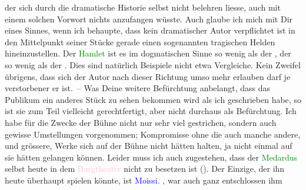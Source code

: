                der sich durch die dramatische Historie selbst nicht belehren liesse, auch mit einem
               solchen Vorwort nichts anzufangen wüsste. Auch glaube ich mich mit Dir eines Sinnes,
               wenn ich behaupte, dass kein dramatischer Autor verpflichtet ist in den Mittelpunkt
               seiner Stücke gerade einen sogenannt\introOben{}en\introOben{} tragischen Helden
               hineinzustellen. Der \textcolor{green}{Hamlet}{} ist
               es im dogmatischen Sinne so wenig als der \label{K_L01981_1v}\label{K_L01981_1h}, der
                  \label{K_L01981_2v}\label{K_L01981_2h} so wenig als der \label{K_L01981_3v}\label{K_L01981_3h}. Dies sind natürlich Beispiele nicht etwa Vergleiche. Kein
               Zweifel übrigens, dass sich der Autor nach dieser Richtung umso mehr erlauben darf je
               verstorbener er ist. – Was Deine weitere Befürchtung anbe{\pb}langt, dass das
               Publikum ein anderes Stück zu sehen bekommen wird als ich geschrieben habe, so ist
               sie zum Teil vielleicht gerechtfertigt, aber nicht durchaus als Befürchtung. Ich habe
               für die Zwecke der Bühne nicht nur sehr viel gestrichen, sondern auch gewisse
               Umstellungen vorgenommen; Kompromisse ohne die auch manche andere\introOben{},\introOben{} und grössere\introOben{},\introOben{} Werke sich auf der Bühne nicht
               hätten halten, ja nicht einmal auf sie hätten gelangen können. Leider muss ich auch
               zugestehen, dass der \textcolor{green}{Medardus}{}
               selbst heute in dem \textcolor{pink}{Burgtheater}{}\ledrightnote{\textcolor{pink}{Burgtheater}} nicht zu besetzen ist
                  (\uline{\label{T_L01981_2v}\label{T_L01981_2h}}). Der Einzige, der ihn heute überhaupt spielen könnte, ist \textcolor{blue}{Moissi}{}\ledrightnote{\textcolor{blue}{Alexander Moissi}}. \label{K_L01981_4v}\label{K_L01981_4h}, war auch ganz entschlossen ihm
